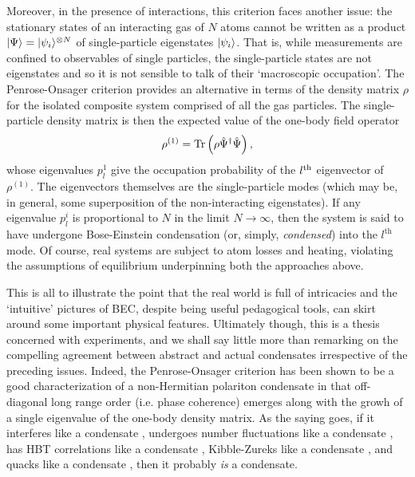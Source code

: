 	Moreover, in the presence of interactions, this criterion faces another issue: the stationary states of an interacting gas of $N$ atoms cannot be written as a product $|\Psi\rangle = |\psi_i\rangle^{\otimes N}$ of single-particle eigenstates $|\psi_i\rangle$.
	That is, while measurements are confined to observables of single particles, the single-particle states are not eigenstates and so it is not sensible to talk of their `macroscopic occupation'.
	The Penrose-Onsager criterion \cite{Penrose56} provides an alternative in terms of the density matrix $\rho$ for the isolated composite system comprised of all the gas particles.
	The single-particle density matrix is then the expected value of the one-body field operator
	\begin{equation}
		\rho^{(1)} = \textrm{Tr}\left(\rho\hat{\Psi}^\dagger\hat{\Psi}\right),
	\end{equation}
	whose eigenvalues $p_{l}^{1}$ give the occupation probability of the $l^{\rm th}$ eigenvector of $\rho^{(1)}$.
	The eigenvectors themselves are the single-particle modes (which may be, in general, some superposition of the non-interacting eigenstates).
	If any eigenvalue $p_{l}^{i}$ is proportional to $N$ in the limit $N\rightarrow\infty$, then the system is said to have undergone Bose-Einstein condensation (or, simply, \emph{condensed}) into the $l^\textrm{th}$ mode.
	Of course, real systems are subject to atom losses and heating, violating the assumptions of equilibrium underpinning both the approaches above.
	
	This is all to illustrate the point that the real world is full of intricacies and the `intuitive' pictures of BEC, despite being useful pedagogical tools, can skirt around some important physical features.
	Ultimately though, this is a thesis concerned with experiments, and we shall say little more than remarking on the compelling agreement between abstract and actual condensates irrespective of the preceding issues.
	Indeed, the Penrose-Onsager criterion has been shown to be a good characterization of a non-Hermitian polariton condensate \cite{Manni12} in that off-diagonal long range order (i.e. phase coherence) emerges along with the growh of a single eigenvalue of the one-body density matrix.
	As the saying goes, if it interferes like a condensate \cite{Andrews97} , undergoes number fluctuations like a condensate \cite{Kristensen19},  has HBT correlations like a condensate \cite{Schellekens05,Jeltes07}, Kibble-Zureks like a condensate \cite{Anquez16}, and quacks like a condensate \cite{Duck01}, then it probably \emph{is} a condensate.

